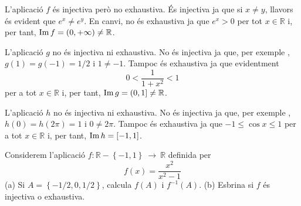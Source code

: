 \begin{solucio}
L'aplicaci\'{o} $f$ \'{e}s injectiva per\`{o} no exhaustiva. \'{E}s
injectiva ja que si $x\neq y$, llavors \'{e}s evident que $e^{x}\neq e^{y}$.
En canvi, no \'{e}s exhaustiva ja que $e^{x}>0$ per tot $x\in \mathbb{R}$ i,
per tant, $\mathop{\rm Im}\nolimits f=(0,+\infty )\neq \mathbb{R}$.

L'aplicaci\'{o} $g$ no \'{e}s injectiva ni exhaustiva. No \'{e}s injectiva
ja que, per exemple , $g(1)=g(-1)=1/2$ i $1\neq -1$. Tampoc \'{e}s
exhaustiva ja que evidentment
\begin{equation*}
0<\frac{1}{1+x^{2}}<1
\end{equation*}%
per a tot $x\in \mathbb{R}$ i, per tant, $\mathop{\rm Im}\nolimits g=(0,1]\neq \mathbb{R}$.

L'aplicaci\'{o} $h$ no \'{e}s injectiva ni exhaustiva. No \'{e}s injectiva
ja que, per exemple , $h(0)=h(2\pi )=1$ i $0\neq 2\pi $. Tampoc \'{e}s
exhaustiva ja que $-1\leq \cos x\leq 1$ per a tot $x\in \mathbb{R}$ i, per
tant, $\mathop{\rm Im}\nolimits h=[-1,1]$.
\end{solucio}

\begin{exer}
Considerem l'aplicaci\'{o} $f:\mathbb{R}-\left\{ -1,1\right\}
~\longrightarrow ~\mathbb{R}$ definida per%
\begin{equation*}
f(x)=\frac{x^{2}}{x^{2}-1}
\end{equation*}%
(a) Si $A=\left\{ -1/2,0,1/2\right\} $, calcula $f(A)$ i $f^{-1}(A)$. (b)
Esbrina si $f$ \'{e}s injectiva o exhaustiva.
\end{exer}

